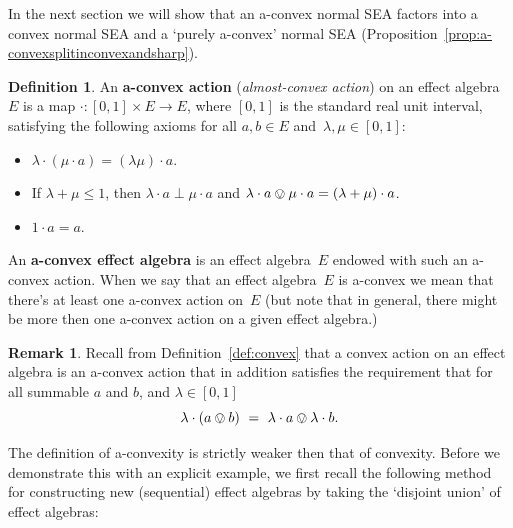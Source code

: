 \documentclass[a4paper, onecolumn, accepted=2020-12-22]{quantumarticle}
\newcommand\Define[1]{\textbf{#1}}
\newcounter{counter}
\theoremstyle{definition}
\newtheorem{definition}[counter]{Definition}
\newtheorem{remark}[counter]{Remark}
\begin{document}
In the next section we will show that an a-convex normal SEA factors
into a convex normal SEA and a `purely a-convex' normal SEA 
(Proposition~\ref{prop:a-convexsplitinconvexandsharp}).
\begin{definition}\label{def:almostconvex}
An \Define{a-convex action} (\emph{almost-convex action}) on an effect algebra~$E$
  is a map $\cdot: [0,1]\times E\rightarrow E$,
    where $[0,1]$ is the standard real unit interval, satisfying
    the following axioms for all $a,b\in E$ and~$\lambda, \mu \in
    [0,1]$:
    \begin{itemize}
        \item $\lambda\cdot (\mu\cdot a) = (\lambda\mu)\cdot a$.
    \item If $\lambda+\mu \leq 1$, then $\lambda \cdot a \perp
    \mu \cdot a$ and $\lambda \cdot a \ovee \mu \cdot a =
    (\lambda+\mu)\cdot a$.
        \item $1\cdot a = a$.
    \end{itemize}
  An \Define{a-convex effect algebra}
is an effect algebra~$E$ endowed
with such an a-convex action.
  When we say that an effect algebra~$E$ is a-convex
we mean that there's at least one a-convex action on~$E$
  (but note that in general, there might be more then one a-convex action on a given effect algebra.)
\end{definition}
\begin{remark}
Recall from Definition~\ref{def:convex} that a convex action on an effect algebra
  is an a-convex action that in addition satisfies
  the requirement that
for all summable $a$ and $b$, and $\lambda\in [0,1]$
    \begin{equation*}
    \lambda\cdot (a\ovee b) \ = \ \lambda\cdot a \ovee \lambda\cdot b.
    \end{equation*}
\end{remark}

The definition of a-convexity is strictly weaker then that of convexity. Before we demonstrate this with an explicit example, we first recall the following method for constructing new (sequential) effect algebras 
by taking the `disjoint union' of effect algebras:
\end{document}
